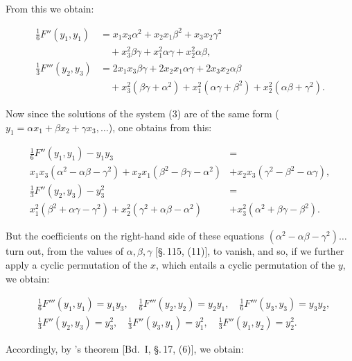 
From this we obtain:

\[
\begin{aligned}
\tfrac{1}{6} F''(y_1, y_1) &= x_1 x_3 \alpha^2 + x_2 x_1 \beta^2 + x_3 x_2 \gamma^2 \\
&\quad + x_3^2 \beta\gamma + x_1^2 \alpha\gamma + x_2^2 \alpha\beta, \\
\tfrac{1}{3} F'''(y_2, y_3) &= 2x_1 x_3 \beta\gamma + 2x_2 x_1 \alpha\gamma + 2x_3 x_2 \alpha\beta \\
&\quad + x_3^2 (\beta\gamma + \alpha^2) + x_1^2 (\alpha\gamma + \beta^2) + x_2^2 (\alpha\beta + \gamma^2).
\end{aligned}
\]

Now since the solutions of the system (3) are of the same form ($y_1 = \alpha x_1 + \beta x_2 + \gamma x_3, \dots$), one obtains from this:

\[
\begin{aligned}
\tfrac{1}{6} F''(y_1, y_1) - y_1 y_3 &= \\
x_1 x_3 (\alpha^2 - \alpha\beta - \gamma^2) + x_2 x_1 (\beta^2 - \beta\gamma - \alpha^2) &+ x_2 x_3 (\gamma^2 - \beta^2 - \alpha\gamma), \\
\tfrac{1}{3} F''(y_2, y_3) - y_3^2 &= \\
x_1^2 (\beta^2 + \alpha\gamma - \gamma^2) + x_2^2 (\gamma^2 + \alpha\beta - \alpha^2) &+ x_3^2 (\alpha^2 + \beta\gamma - \beta^2).
\end{aligned}
\]

But the coefficients on the right-hand side of these equations $(\alpha^2 - \alpha\beta - \gamma^2) \dots$ turn out, from the values of $\alpha, \beta, \gamma$ [\S.\,115, (11)], to vanish, and so, if we further apply a cyclic permutation of the $x$, which entails a cyclic permutation of the $y$, we obtain:

\[
\begin{aligned}
&\tfrac{1}{6} F'''(y_1, y_1) = y_1 y_3, \quad \tfrac{1}{6} F'''(y_2, y_2) = y_2 y_1, \quad \tfrac{1}{6} F'''(y_3, y_3) = y_3 y_2, \\
&\tfrac{1}{3} F''(y_2, y_3) = y_3^2, \quad \tfrac{1}{3} F''(y_3, y_1) = y_1^2, \quad \tfrac{1}{3} F''(y_1, y_2) = y_2^2.
\end{aligned}
\]

Accordingly, by 's theorem [Bd.\ I, \S.\,17, (6)], we obtain:


